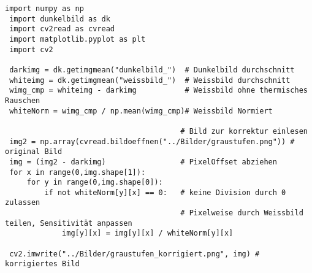 \begin{lstlisting}[style=PYTHON,frame=single,
 caption=Bildkorrektur,
 captionpos=b,
 label=lst:Bildkorrektur]
 import numpy as np
 import dunkelbild as dk
 import cv2read as cvread
 import matplotlib.pyplot as plt
 import cv2
 
 darkimg = dk.getimgmean("dunkelbild_")  # Dunkelbild durchschnitt
 whiteimg = dk.getimgmean("weissbild_")  # Weissbild durchschnitt
 wimg_cmp = whiteimg - darkimg           # Weissbild ohne thermisches Rauschen
 whiteNorm = wimg_cmp / np.mean(wimg_cmp)# Weissbild Normiert
 
 										# Bild zur korrektur einlesen
 img2 = np.array(cvread.bildoeffnen("../Bilder/graustufen.png")) # original Bild
 img = (img2 - darkimg) 				# PixelOffset abziehen
 for x in range(0,img.shape[1]):
     for y in range(0,img.shape[0]):
         if not whiteNorm[y][x] == 0:	# keine Division durch 0 zulassen
 	    								# Pixelweise durch Weissbild teilen, Sensitivität anpassen
             img[y][x] = img[y][x] / whiteNorm[y][x]
 
 cv2.imwrite("../Bilder/graustufen_korrigiert.png", img) # korrigiertes Bild
 \end{lstlisting}